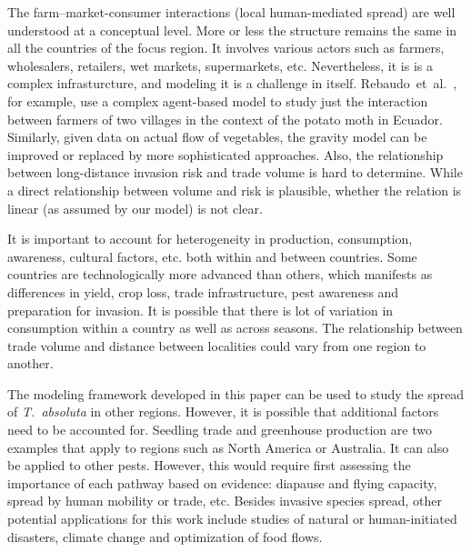 \documentclass[11pt]{article}
\newcommand{\tuta}{\emph{T.~absoluta}}
\theoremstyle{definition}
\begin{document}
The farm--market-consumer interactions (local human-mediated spread) are
well understood at a conceptual level. More or less the structure remains
the same in all the countries of the focus region. It involves various
actors such as farmers, wholesalers, retailers, wet markets, supermarkets,
etc. Nevertheless, it is is a complex infrasturcture, and modeling it is a
challenge in itself. Rebaudo~et~al.~\cite{rebaudo2011}, for example, use a complex
agent-based model to study just the interaction between farmers of two
villages in the context of the potato moth in Ecuador. Similarly, given
data on actual flow of vegetables, the gravity model can be improved or
replaced by more sophisticated approaches. Also, the relationship between
long-distance invasion risk and trade volume is hard to determine. While
a direct relationship between volume and risk is plausible, whether
the relation is linear (as assumed by our model) is not clear.

It is important to account for heterogeneity in production, consumption,
awareness, cultural factors, etc. both within and between countries. Some
countries are technologically more advanced than others, which manifests as
differences in yield, crop loss, trade infrastructure, pest awareness and
preparation for invasion. It is possible that there is lot of variation in consumption
within a country as well as across seasons. The relationship between trade
volume and distance between localities could vary from one region to
another.

The modeling framework developed in this paper can be used to study the
spread of \tuta{} in other regions. However, it is possible that additional
factors need to be accounted for. Seedling trade and greenhouse production
are two examples that apply to regions such as North America or Australia. 
It can also be applied to other pests. However, this would require first
assessing the importance of each pathway based on evidence: diapause and flying
capacity, spread by human mobility or trade, etc.  Besides invasive species
spread, other potential applications for this work include studies of
natural or human-initiated disasters, climate
change and optimization of food
flows.
 
\end{document}
